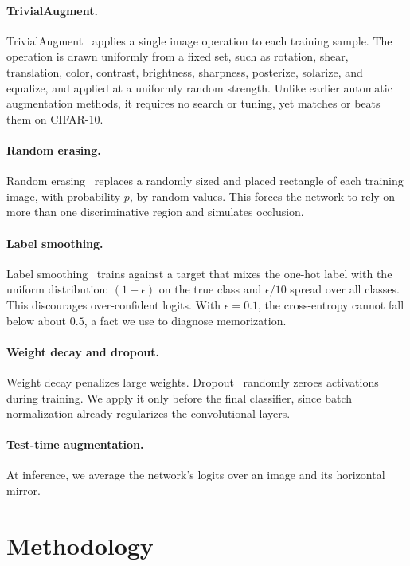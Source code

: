 \documentclass[letterpaper]{article} %
\begin{document}
\paragraph{TrivialAugment.}
TrivialAugment~\citep{muller2021trivialaugment} applies a single image operation to each training sample. The operation is drawn uniformly from a fixed set, such as rotation, shear, translation, color, contrast, brightness, sharpness, posterize, solarize, and equalize, and applied at a uniformly random strength. Unlike earlier automatic augmentation methods, it requires no search or tuning, yet matches or beats them on CIFAR-10.

\paragraph{Random erasing.}
Random erasing~\citep{zhong2020randomerasing} replaces a randomly sized and placed rectangle of each training image, with probability $p$, by random values. This forces the network to rely on more than one discriminative region and simulates occlusion.

\paragraph{Label smoothing.}
Label smoothing~\citep{szegedy2016inception} trains against a target that mixes the one-hot label with the uniform distribution: $(1-\epsilon)$ on the true class and $\epsilon/10$ spread over all classes. This discourages over-confident logits. With $\epsilon=0.1$, the cross-entropy cannot fall below about $0.5$, a fact we use to diagnose memorization.

\paragraph{Weight decay and dropout.}
Weight decay penalizes large weights. Dropout~\citep{srivastava2014dropout} randomly zeroes activations during training. We apply it only before the final classifier, since batch normalization already regularizes the convolutional layers.

\paragraph{Test-time augmentation.}
At inference, we average the network's logits over an image and its horizontal mirror.

\section{Methodology}
\end{document}

